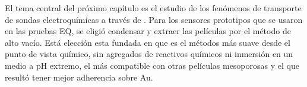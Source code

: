 	El tema central del próximo capítulo es el estudio de los fenómenos de transporte de sondas electroquímicas a través de \pdm. Para los sensores prototipos que se usaron en las pruebas EQ, se eligió condensar y extraer las películas por el método de alto vacío. Está elección esta fundada en que es el métodos más suave desde el punto de vista químico, sin agregados de reactivos químicos ni inmersión en un medio a pH extremo, el más compatible con otras películas mesoporosas y el que resultó tener mejor adherencia sobre Au. 			 

	



	

